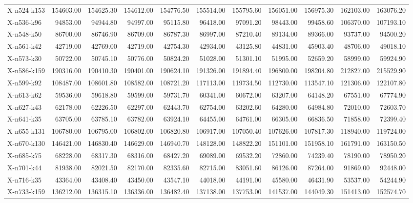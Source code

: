 \documentclass[letterpaper]{article} %
\begin{document}
\begin{longtable}{@{}l rr rr rr rr rr@{}}
X-n524-k153 & 154603.00 & 154625.30 & 154612.00 & 154776.50 & 155514.00 & 155795.60 & 156051.00 & 156975.30 & 162103.00 & 163076.20 \\
X-n536-k96 & 94853.00 & 94944.80 & 94997.00 & 95115.80 & 96418.00 & 97091.20 & 98443.00 & 99458.60 & 106370.00 & 107193.10 \\
X-n548-k50 & 86700.00 & 86746.90 & 86709.00 & 86787.30 & 86997.00 & 87210.40 & 89134.00 & 89366.00 & 93737.00 & 94500.20 \\
X-n561-k42 & 42719.00 & 42769.00 & 42719.00 & 42754.30 & 42934.00 & 43125.80 & 44831.00 & 45903.40 & 48706.00 & 49018.10 \\
X-n573-k30 & 50722.00 & 50745.10 & 50776.00 & 50824.20 & 51028.00 & 51301.10 & 51995.00 & 52659.20 & 58999.00 & 59924.90 \\
X-n586-k159 & 190316.00 & 190410.30 & 190401.00 & 190624.10 & 191326.00 & 191894.40 & 196800.00 & 198204.80 & 212827.00 & 215529.90 \\
X-n599-k92 & 108487.00 & 108601.80 & 108582.00 & 108721.20 & 117113.00 & 119734.50 & 112730.00 & 113547.10 & 121306.00 & 122107.80 \\
X-n613-k62 & 59536.00 & 59618.80 & 59599.00 & 59731.70 & 60341.00 & 60672.00 & 63207.00 & 64148.20 & 67551.00 & 67774.90 \\
X-n627-k43 & 62178.00 & 62226.50 & 62297.00 & 62443.70 & 62754.00 & 63202.60 & 64280.00 & 64984.80 & 72010.00 & 72603.70 \\
X-n641-k35 & 63705.00 & 63785.10 & 63782.00 & 63924.10 & 64455.00 & 64761.00 & 66305.00 & 66836.50 & 71858.00 & 72399.40 \\
X-n655-k131 & 106780.00 & 106795.00 & 106802.00 & 106820.80 & 106917.00 & 107050.40 & 107626.00 & 107817.30 & 118940.00 & 119724.00 \\
X-n670-k130 & 146421.00 & 146830.40 & 146629.00 & 146940.70 & 148128.00 & 148822.20 & 151101.00 & 151958.10 & 161791.00 & 163150.50 \\
X-n685-k75 & 68228.00 & 68317.30 & 68316.00 & 68427.20 & 69089.00 & 69532.20 & 72860.00 & 74239.40 & 78190.00 & 78950.20 \\
X-n701-k44 & 81938.00 & 82021.50 & 82170.00 & 82335.60 & 82715.00 & 83051.60 & 86126.00 & 87264.00 & 91869.00 & 92448.00 \\
X-n716-k35 & 43364.00 & 43408.40 & 43450.00 & 43547.10 & 44018.00 & 44191.00 & 45580.00 & 46431.90 & 53537.00 & 54244.90 \\
X-n733-k159 & 136212.00 & 136315.10 & 136336.00 & 136482.40 & 137138.00 & 137753.00 & 141537.00 & 144049.30 & 151413.00 & 152574.70 \\

\end{longtable}
\end{document}

